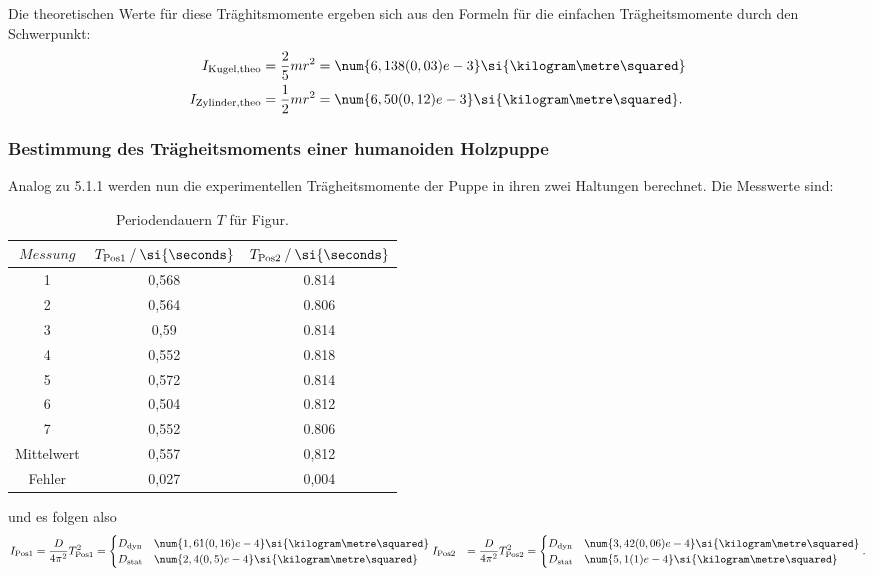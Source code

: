 Die theoretischen Werte für diese Träghitsmomente ergeben sich aus den Formeln für die einfachen Trägheitsmomente durch den Schwerpunkt:
\begin{align*}
    I_\text{Kugel,theo} &= \frac{2}{5}mr^2 = \num{6,138(0,03)e-3}\si{\kilogram\metre\squared} \\
    I_\text{Zylinder,theo} &= \frac{1}{2}mr^2 = \num{6,50(0,12)e-3}\si{\kilogram\metre\squared}.
\end{align*}

\subsubsection{Bestimmung des Trägheitsmoments einer humanoiden Holzpuppe}
\label{subs:Bestimmung des Trägheitsmoments einer humanoiden Holzpuppe}

Analog zu 5.1.1 werden nun die experimentellen Trägheitsmomente der Puppe in ihren zwei Haltungen berechnet.
Die Messwerte sind:

\begin{table}
  \centering
  \caption{Periodendauern $T$ für Figur.}
  \begin{tabular}{c S[table-format=1,3] S[table-format=1,3]}
    \toprule
    $Messung$ & $T_{\text{Pos1}}\:/\:\si{\seconds}$ &$T_{\text{Pos2}}\:/\:\si{\seconds} $\\
    &   0,568  &  0.814    \\
    2&   0,564  &  0.806    \\
    3&   0,59   &  0.814    \\
    4&   0,552  &  0.818    \\
    5&   0,572  &  0.814    \\
    6&   0,504  &  0.812    \\
    7&   0,552  &  0.806    \\
    \midrule
    Mittelwert  & 0,557  & 0,812\\
    Fehler      & 0,027  & 0,004\\
    \bottomrule
  \end{tabular}
\end{table}

und es folgen also
\begin{align*}
    I_{\text{Pos1}} &= \frac{D}{4\pi^2}T_{\text{Pos1}}^2
    = \begin{cases} 
    D_{\text{dyn}}  &
    \num{1,61(0,16)e-4}\si{\kilogram\metre\squared}\\
    D_{\text{stat}} &
    \num{2,4(0,5)e-4}\si{\kilogram\metre\squared}
  \end{cases}
    I_{\text{Pos2}} &= \frac{D}{4\pi^2}T_{\text{Pos2}}^2 
    = \begin{cases}
    D_{\text{dyn}} &
    \num{3,42(0,06)e-4}\si{\kilogram\metre\squared}\\
    D_{\text{stat}} &
    \num{5,1(1)e-4}\si{\kilogram\metre\squared}
    \end{cases}.
\end{align*}

